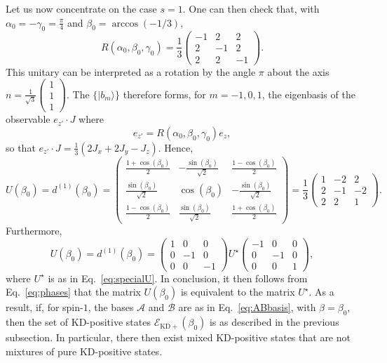 \documentclass[a4paper, notitlepage, 11pt]{article}
\numberwithin{equation}{section}
\newcommand{\Acal}{{\mathcal A}}
\newcommand{\Bcal}{{\mathcal B}}
\newcommand{\EcalKDC}{{\mathcal E}_{\mathrm{KD+}}}
\begin{document}
Let us now concentrate on the case $s=1$. One can then check that, with $\alpha_0=-\gamma_0=\frac{\pi}{4}$ and $\beta_0=\arccos(-1/3)$,
$$
R(\alpha_0,\beta_0,\gamma_0)=
\frac13\begin{pmatrix} -1&2&2\\2&-1&2\\ 2&2&-1
\end{pmatrix}.
$$
This unitary can be interpreted as a rotation by the angle $\pi$ about the axis $n=\frac{1}{\sqrt{3}}
\begin{pmatrix} 1\\1\\1\end{pmatrix}$.
The $ \{ |b_m\rangle \}$ therefore forms, for $m=-1,0,1$,  the eigenbasis of the observable $e_{z'}\cdot J$ where 
$$
e_{z'}=R(\alpha_0, \beta_0,\gamma_0) e_z,
$$
so that $e_{z'}\cdot J=\frac13(2J_x+2J_y-J_z)$.
Hence,
$$
U(\beta_0)=d^{(1)}(\beta_0)=\begin{pmatrix} \frac{1+\cos(\beta_0)}{2}&-\frac{\sin(\beta_0)}{\sqrt{2}}&\frac{1-\cos(\beta_0)}{2}\\ \frac{\sin(\beta_0)}{\sqrt{2}}&\cos(\beta_0)&-\frac{\sin(\beta_0)}{\sqrt{2}}\\ \frac{1-\cos(\beta_0)}{2}&\frac{\sin(\beta_0)}{\sqrt{2}}&\frac{1+\cos(\beta_0)}{2}
\end{pmatrix} = \frac{1}{3}\begin{pmatrix} 1&-2&2\\ 2&-1&-2\\ 2&2&1
\end{pmatrix}.
$$
Furthermore, 
$$
U(\beta_0)=d^{(1)}(\beta_0)=\begin{pmatrix}1&0&0\\0&-1&0\\0&0&-1\end{pmatrix}U^\star
\begin{pmatrix}-1&0&0\\0&-1&0\\0&0&1\end{pmatrix},
$$
where $U^\star$ is as in Eq.~\eqref{eq:specialU}.  
In conclusion, it then follows from Eq.~\eqref{eq:phases} that the matrix $U(\beta_0)$ is equivalent to the matrix $U^\star$.
As a result, if, for spin-$1$, the bases $\Acal$ and $\Bcal$ are as in Eq.~\eqref{eq:ABbasis}, with $\beta=\beta_0$, then the set of KD-positive states $\EcalKDC(\beta_0)$ is as described in the previous subsection. In particular, there then  exist mixed KD-positive states that are not mixtures of pure KD-positive states. 
\end{document}
